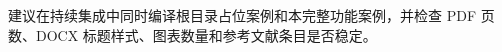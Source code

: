 \begin{yibinappendices}

建议在持续集成中同时编译根目录占位案例和本完整功能案例，并检查 PDF 页数、DOCX 标题样式、图表数量和参考文献条目是否稳定。
\end{yibinappendices}
